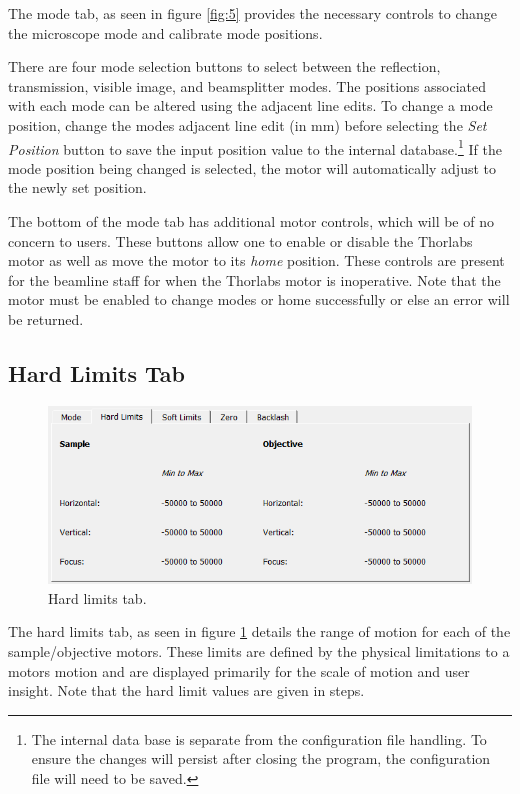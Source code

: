\documentclass[a4paper, 12pt]{report}
\begin{document}
    The mode tab, as seen in figure \ref{fig:5} provides the necessary controls to change the microscope mode and calibrate mode positions.
    
    There are four mode selection buttons to select between the reflection, transmission, visible image, and beamsplitter modes. The positions associated with each mode can be altered using the adjacent line edits. To change a mode position, change the modes adjacent line edit (in mm) before selecting the \textit{Set Position} button to save the input position value to the internal database.\footnote{The internal data base is separate from the configuration file handling. To ensure the changes will persist after closing the program, the configuration file will need to be saved.} If the mode position being changed is selected, the motor will automatically adjust to the newly set position.
    
    The bottom of the mode tab has additional motor controls, which will be of no concern to users. These buttons allow one to enable or disable the Thorlabs motor as well as move the motor to its \textit{home} position. These controls are present for the beamline staff for when the Thorlabs motor is inoperative. Note that the motor must be enabled to change modes or home successfully or else an error will be returned.
    
    
    \subsection{Hard Limits Tab}
    \begin{figure}[h]
        \centering
        \includegraphics{figures/hard_limits_tab.png}
        \caption{Hard limits tab.}
        \label{fig:6}
    \end{figure}
    
    The hard limits tab, as seen in figure \ref{fig:6} details the range of motion for each of the sample/objective motors. These limits are defined by the physical limitations to a motors motion and are displayed primarily for the scale of motion and user insight. Note that the hard limit values are given in steps.
    
\end{document}
